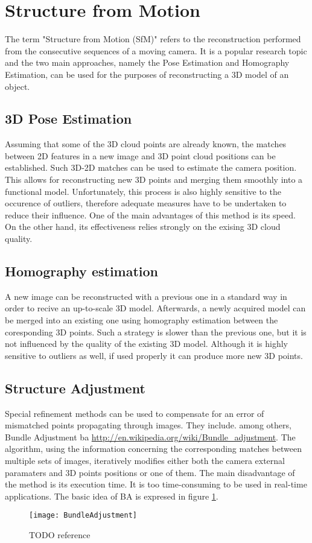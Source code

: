 \section{Structure from Motion}
The term "Structure from Motion (SfM)" refers to the reconstruction performed from the consecutive sequences of a moving camera. It is a popular research topic and the two main approaches, namely the Pose Estimation and Homography Estimation, can be used for the purposes of reconstructing a 3D model of an object.
\subsection{3D Pose Estimation}
Assuming that some of the 3D cloud points are already known, the matches between 2D features in a new image and 3D point cloud positions can be established. Such 3D-2D matches can be used to estimate the camera position. This allows for reconstructing new 3D points and merging them smoothly into a functional model. Unfortunately,  this process is also highly sensitive to the occurence of outliers, therefore adequate measures have to be undertaken to reduce their influence. One of the main advantages of this method is its speed. On the other hand, its effectiveness relies strongly on the exising 3D cloud quality. 
\subsection{Homography estimation}
A new image can be reconstructed with a previous one in a standard way in order to recive an up-to-scale 3D model. Afterwards, a newly acquired model can be merged into an existing one using homography estimation between the coresponding 3D points. Such a strategy is slower than the previous one, but it is not influenced by the quality of the existing 3D model. Although it is highly sensitive to outliers as well, if used properly it can produce more new 3D points.
\subsection{Structure Adjustment}
Special refinement methods can be used to compensate for an error of mismatched points propagating through images. They include. among others, Bundle Adjustment \gls{ba} \url{http://en.wikipedia.org/wiki/Bundle_adjustment}. The algorithm, using the information concerning the corresponding matches between multiple sets of images, iteratively modifies either both the camera external paramaters and 3D points positions or one of them. The main disadvantage of the method is its execution time. It is too time-consuming to be used in real-time applications. The basic idea of BA is expresed in figure \ref{fig:BundleAdjustment}.
\begin{figure}[p]
    \centering
    \texttt{[image: BundleAdjustment]}
    \caption{TODO reference}
    \label{fig:BundleAdjustment}
\end{figure}

